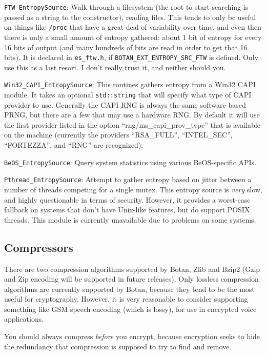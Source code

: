 \documentclass{article}
\newcommand{\filename}[1]{\texttt{#1}}
\newcommand{\macro}[1]{\texttt{#1}}
\newcommand{\type}[1]{\texttt{#1}}
\begin{document}
\noindent
\type{FTW\_EntropySource}: Walk through a filesystem (the root to start
searching is passed as a string to the constructor), reading files. This tends
to only be useful on things like \filename{/proc} that have a great deal of
variability over time, and even then there is only a small amount of entropy
gathered: about 1 bit of entropy for every 16 bits of output (and many hundreds
of bits are read in order to get that 16 bits). It is declared in
\filename{es\_ftw.h}, if \macro{BOTAN\_EXT\_ENTROPY\_SRC\_FTW} is defined. Only
use this as a last resort. I don't really trust it, and neither should you.

\noindent
\type{Win32\_CAPI\_EntropySource}: This routines gathers entropy from a Win32
CAPI module. It takes an optional \type{std::string} that will specify what
type of CAPI provider to use. Generally the CAPI RNG is always the same
software-based PRNG, but there are a few that may use a hardware RNG. By
default it will use the first provider listed in the option
``rng/ms\_capi\_prov\_type'' that is available on the machine (currently the
providers ``RSA\_FULL'', ``INTEL\_SEC'', ``FORTEZZA'', and ``RNG'' are
recognized).

\noindent
\type{BeOS\_EntropySource}: Query system statistics using various BeOS-specific
APIs.

\noindent
\type{Pthread\_EntropySource}: Attempt to gather entropy based on jitter
between a number of threads competing for a single mutex. This entropy source
is \emph{very} slow, and highly questionable in terms of security. However, it
provides a worst-case fallback on systems that don't have Unix-like features,
but do support POSIX threads. This module is currently unavailable due to
problems on some systems.

\subsection{Compressors}

There are two compression algorithms supported by Botan, Zlib and Bzip2 (Gzip
and Zip encoding will be supported in future releases). Only lossless
compression algorithms are currently supported by Botan, because they tend to
be the most useful for cryptography. However, it is very reasonable to consider
supporting something like GSM speech encoding (which is lossy), for use in
encrypted voice applications.

You should always compress \emph{before} you encrypt, because encryption seeks
to hide the redundancy that compression is supposed to try to find and remove.
\end{document}

